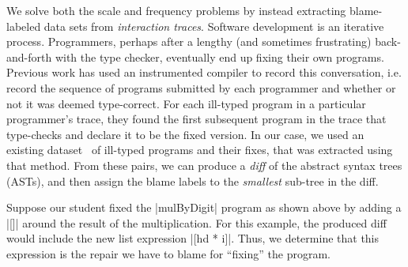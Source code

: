  We solve both the scale and frequency problems by
instead extracting blame-labeled data sets from \emph{interaction traces}.
Software development is an iterative process. Programmers, perhaps after a
lengthy (and sometimes frustrating) back-and-forth with the type checker,
eventually end up fixing their own programs. Previous work has used an
instrumented \ocaml compiler to record this conversation, i.e. record the
sequence of programs submitted by each programmer and whether or not it was
deemed type-correct. For each ill-typed program in a particular programmer's
trace, they found the first subsequent program in the trace that type-checks and
declare it to be the fixed version. In our case, we used an existing
dataset~\citep[][]{yunounderstand, Seidel:2017} of ill-typed programs and their
fixes, that was extracted using that method. From these pairs, we can produce a
\emph{diff} of the abstract syntax trees (ASTs), and then assign the blame
labels to the \emph{smallest} sub-tree in the diff.

 Suppose our student fixed the |mulByDigit| program as shown
above by adding a |[]| around the result of the multiplication. For this
example, the produced diff would include the new list expression |[hd * i]|.
Thus, we determine that this expression is the repair we have to blame for
``fixing'' the program.



